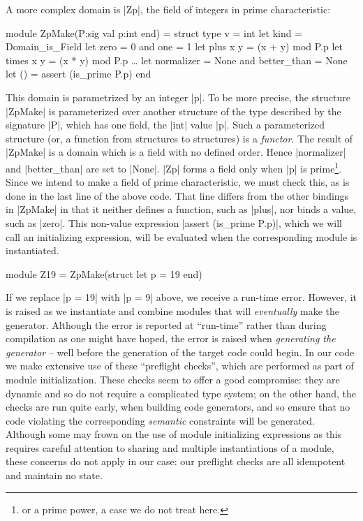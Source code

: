 \documentclass{elsart}
\begin{document}
A more complex domain is |Zp|, the field of integers in prime
characteristic:
\begin{code}
module ZpMake(P:sig val p:int end) = struct
    type v = int
    let kind = Domain_is_Field
    let zero = 0 and one = 1
    let plus x y = (x + y) mod P.p
    let times x y = (x * y) mod P.p
    \dots
    let normalizer = None and better_than = None
    let () = assert (is_prime P.p)
end
\end{code}
This domain is parametrized by an integer |p|. 
To be more precise, the structure |ZpMake| is
parameterized over another structure of the type described by
the signature |P|, which has one field, the |int| value |p|.
Such a parameterized structure (or, a function from structures to
structures) is a \emph{functor}. The result of |ZpMake| is a domain which is a
field with no defined order. Hence
|normalizer| and |better_than| are set to |None|. |Zp| forms
a field only when |p| is prime\footnote{or a prime power, a case we do
not treat here.}.  Since we intend to make a field of prime characteristic, 
we must check this, as is done
in the last line of the above code. That line differs from the other 
bindings in |ZpMake| in that it neither defines a function, such as
|plus|, nor binds a value, such as |zero|. This non-value
expression |assert (is_prime P.p)|, which we will call an initializing
expression, will be evaluated
when the corresponding module is instantiated.
\begin{code}
module Z19 = ZpMake(struct let p = 19 end)
\end{code}
If we
replace |p = 19| with |p = 9| above, we receive a run-time
error. However, it is raised as we instantiate and combine modules that
will \emph{eventually} make the generator.  Although the error is reported at
``run-time'' rather than during compilation as one might have hoped, the error
is raised when \emph{generating the generator} -- well before the
generation of the target code could begin.  In our code we make
extensive use of these ``preflight checks'', which are performed as part of
module initialization. These checks seem to offer a good compromise:
they are dynamic and so do not require a complicated type system; on
the other hand, the checks are run quite early, when building
code generators, and so ensure that no code violating the
corresponding \emph{semantic} constraints will be generated. Although
some may frown on the use of module initializing expressions 
as this requires careful attention to sharing and multiple instantiations
of a module, these concerns do not apply in our case: our preflight
checks are all idempotent and maintain no state.
\end{document}
